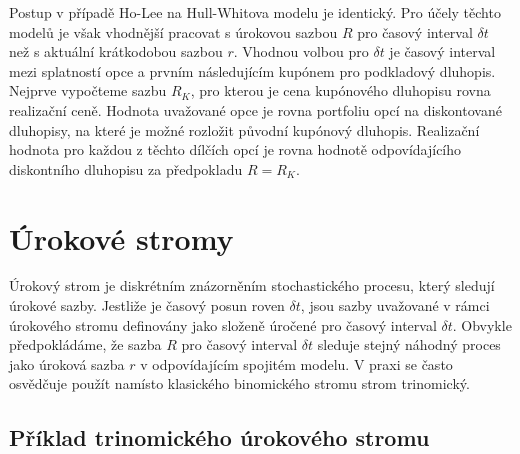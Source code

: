 \documentclass[a4paper]{book}
\begin{document}
Postup v případě Ho-Lee na Hull-Whitova modelu je identický. Pro účely těchto modelů je však vhodnější pracovat s úrokovou sazbou $R$ pro časový interval $\delta t$ než s aktuální krátkodobou sazbou $r$. Vhodnou volbou pro $\delta t$ je časový interval mezi splatností opce a prvním následujícím kupónem pro podkladový dluhopis. Nejprve vypočteme sazbu $R_K$, pro kterou je cena kupónového dluhopisu rovna realizační ceně. Hodnota uvažované opce je rovna portfoliu opcí na diskontované dluhopisy, na které je možné rozložit původní kupónový dluhopis. Realizační hodnota pro každou z těchto dílčích opcí je rovna hodnotě odpovídajícího diskontního dluhopisu za předpokladu $R = R_K$.

\section{Úrokové stromy}

Úrokový strom je diskrétním znázorněním stochastického procesu, který sledují úrokové sazby. Jestliže je časový posun roven $\delta t$, jsou sazby uvažované v rámci úrokového stromu definovány jako složeně úročené pro časový interval $\delta t$. Obvykle předpokládáme, že sazba $R$ pro časový interval $\delta t$ sleduje stejný náhodný proces jako úroková sazba $r$ v odpovídajícím spojitém modelu. V praxi se často osvědčuje použít namísto klasického binomického stromu strom trinomický.

\subsection{Příklad trinomického úrokového stromu}
\end{document}
